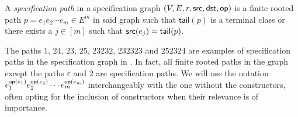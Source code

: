 \begin{definition}
A \emph{specification path} in a specification graph $(V,E,r,\textsf{src},\textsf{dst},\textsf{op})$ is a finite rooted path $p=e_1e_2\dotsm e_m \in E^m$ in said graph such that $\textsf{tail}(p)$ is a terminal class or there exists a $j\in[m]$ such that $\textsf{src}(e_j) = \textsf{tail}(p)$.
\end{definition}
The paths $1$, $24$, $23$, $25$, $23232$, $232323$ and $252324$ are examples of specification paths in the specification graph in . In fact, all finite rooted paths in the graph except the paths $\varepsilon$ and $2$ are specification paths. We will use the notation $e_1^{\textsf{op}(e_1)}e_2^{\textsf{op}(e_2)}\dotsm e_m^{\textsf{op}(e_m)}$ interchangeably with the one without the constructors, often opting for the inclusion of constructors when their relevance is of importance. 

